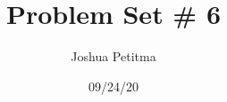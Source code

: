 \documentclass[11pt]{article}
\title{Problem Set \# 6}
\author{Joshua Petitma}
\date{09/24/20}
\begin{document}
    \section[Question 1]{}
    \subsection[1a]{}
    \subsection[1b]{}
    \section[Question 2]{}
    \subsection[2a]{}
\end{document}
